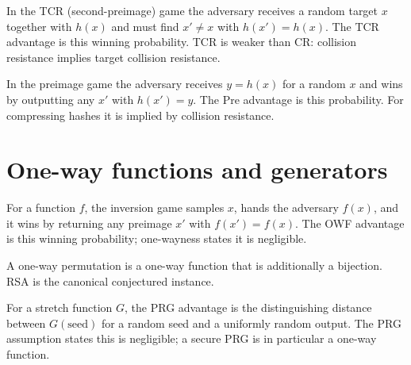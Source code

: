 \begin{definition}
  \label{def:tcr}
  \leanok
  In the TCR (second-preimage) game the adversary receives a random target $x$
  together with $h(x)$ and must find $x' \neq x$ with $h(x') = h(x)$. The TCR
  advantage is this winning probability. TCR is weaker than CR: collision
  resistance implies target collision resistance.
\end{definition}

\begin{definition}
  \label{def:pre}
  \leanok
  In the preimage game the adversary receives $y = h(x)$ for a random $x$ and
  wins by outputting any $x'$ with $h(x') = y$. The Pre advantage is this
  probability. For compressing hashes it is implied by collision resistance.
\end{definition}

\section{One-way functions and generators}

\begin{definition}
  \label{def:owf}
  \leanok
  For a function $f$, the inversion game samples $x$, hands the adversary
  $f(x)$, and it wins by returning any preimage $x'$ with $f(x') = f(x)$. The
  OWF advantage is this winning probability; one-wayness states it is negligible.
\end{definition}

\begin{definition}
  \label{def:owp}
  \leanok
  A one-way permutation is a one-way function that is additionally a bijection.
  RSA is the canonical conjectured instance.
\end{definition}

\begin{definition}
  \label{def:prg}
  \leanok
  For a stretch function $G$, the PRG advantage is the distinguishing distance
  between $G(\text{seed})$ for a random seed and a uniformly random output. The
  PRG assumption states this is negligible; a secure PRG is in particular a
  one-way function.
\end{definition}

